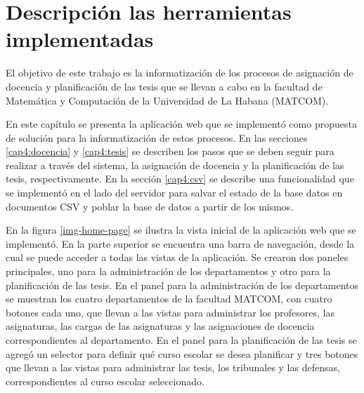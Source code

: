 \chapter{Descripción las herramientas implementadas}\label{chapter:implementation}
El objetivo de este trabajo es la informatización de los 
procesos de asignación de docencia y 
planificación de las tesis que se llevan a cabo 
en la facultad de Matemática y Computación de la Universidad de La Habana (MATCOM). 

En este capítulo se presenta la aplicación web que se implementó 
como propuesta de solución para la informatización de estos procesos. 
En las secciones \ref{cap4:docencia} y \ref{cap4:tesis} se describen los pasos que se deben 
seguir para realizar a través del sistema, la asignación de docencia y la planificación de las tesis, respectivamente.
En la sección \ref{cap4:csv} se describe una funcionalidad que se implementó en el lado del servidor 
para salvar el estado de la base datos en documentos CSV y poblar la base de datos a partir de los mismos.








En la figura \ref{img-home-page} se ilustra la vista inicial de la 
aplicación web que se implementó. En la parte superior se encuentra una 
barra de navegación, desde la cual se puede acceder a todas las vistas 
de la aplicación. Se crearon dos paneles principales, uno para la administración de 
los departamentos y otro para la planificación de las tesis. En el 
panel para la administración de los departamentos se muestran los cuatro departamentos 
de la facultad MATCOM, con cuatro botones cada uno, que llevan a las vistas 
para administrar los profesores, las asignaturas, las cargas de las asignaturas 
y las asignaciones de docencia correspondientes al departamento.
En el panel para la planificación de las tesis se agregó un selector para definir qué curso escolar 
se desea planificar y tres botones que 
llevan a las vistas para administrar las tesis, los tribunales y las defensas, correspondientes 
al curso escolar seleccionado.


